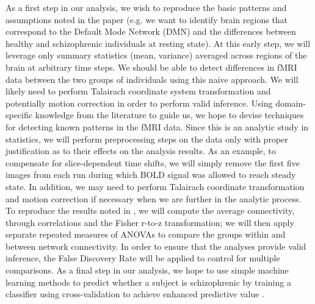 \documentclass[11pt]{article}
\begin{document}
As a first step in our analysis, we wish to reproduce the basic patterns and
assumptions noted in the paper (e.g. we want to identify brain regions that
correspond to the Default Mode Network (DMN) and the differences between
healthy and schizophrenic individuals at resting state). At this early step,
we will leverage only summary statistics (mean, variance) averaged across 
regions of the brain at arbitrary time steps. We should be able to detect 
differences in fMRI data between the two groups of individuals using this 
naive approach. We will likely need to perform Talairach coordinate system 
transformation and potentially motion correction in order to perform valid 
inference. Using domain-specific knowledge from the literature to guide us, 
we hope to devise techniques for detecting known patterns in the fMRI data. 
Since this is an analytic study in statistics, we will perform preprocessing
steps on the data only with proper justification as to their effects on the 
analysis results. As an example, to compensate for slice-dependent time shifts,
we will simply remove the first five images from each run during which BOLD 
signal was allowed to reach steady state. In addition, we may need to perform
Talairach coordinate transformation and motion correction if necessary when 
we are further in the analytic process. To reproduce the results noted in 
\cite{repovs2011}, we will compute the average connectivity, through 
correlations and the Fisher r-to-z transformation; we will then apply separate
repeated measures of ANOVAs to compare the groups within and between network
connectivity. In order to ensure that the analyses provide valid inference, 
the False Discovery Rate will be applied to control for multiple comparisons. 
As a final step in our analysis, we hope to use simple machine learning methods
to predict whether a subject is schizophrenic by training a classifier using
cross-validation to achieve enhanced predictive value \cite{arbabshirani2013}.



\end{document}
